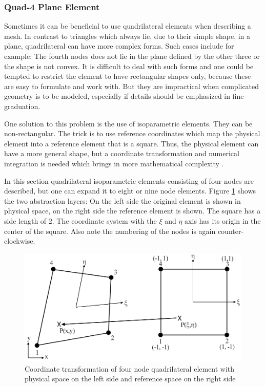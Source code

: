   
  
  \subsubsection{Quad-4 Plane Element}
  Sometimes it can be beneficial to use quadrilateral elements when describing a mesh. In contrast to triangles which always lie, due to their simple shape, in a plane, quadrilateral can have more complex forms. Such cases include for example: The fourth nodes does not lie in the plane defined by the other three or the shape is not convex. It is difficult to deal with such forms and one could be tempted to restrict the element to have rectangular shapes only, because these are easy to formulate and work with. But they are impractical when complicated geometry is to be modeled, especially if details should be emphasized in fine graduation.
    
  One solution to this problem is the use of isoparametric elements. They can be non-rectangular. The trick is to use reference coordinates which map the physical element into a reference element that is a square. Thus, the physical element can have a more general shape, but a coordinate transformation and numerical integration is needed which brings in more mathematical complexity \cite{cook2002concepts}.
  
  In this section quadrilateral isoparametric elements consisting of four nodes are described, but one can expand it to eight or nine node elements. Figure \ref{fig:coord_trafo} shows the two abstraction layers: On the left side the original element is shown in physical space, on the right side the reference element is shown. The square has a side length of $2$. The coordinate system with the $\xi$ and $\eta$ axis has its origin in the center of the square. Also note the numbering of the nodes is again counter-clockwise.
  \begin{figure}%
  	\centering
  	\includegraphics[width=0.97\linewidth]{figures/coord_trafo}
  	\caption{Coordinate transformation of four node quadrilateral element with physical space on the left side and reference space on the right side}
  	\label{fig:coord_trafo}
  \end{figure}
  
